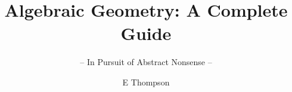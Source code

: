 \documentclass[graybox,envcountchap,sectrefs]{style/svmono}
\begin{document}
\author{E Thompson}
\title{Algebraic Geometry: A Complete Guide}
\subtitle{-- In Pursuit of Abstract Nonsense --}
\maketitle

\frontmatter%

%
%

%

\tableofcontents

%


\mainmatter%














































\backmatter%
%
%
%
\printindex

\end{document}
